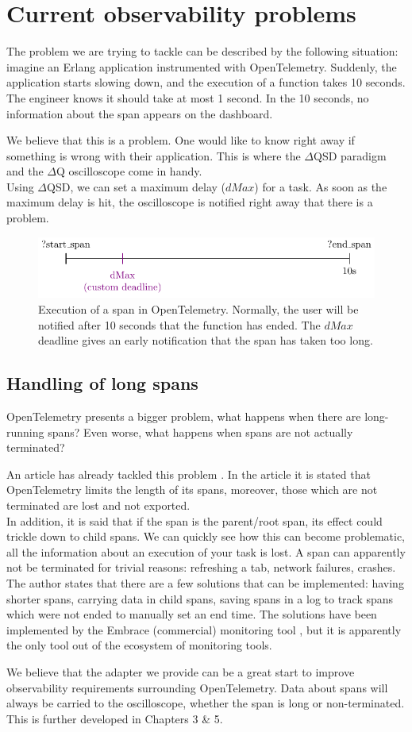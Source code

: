 \section{Current observability problems}
    The problem we are trying to tackle can be described by the following situation: 
    imagine an Erlang application instrumented with OpenTelemetry. Suddenly, the application starts slowing down, and the execution of a function takes 10 seconds. The engineer knows it should take at most 1 second. In the 10 seconds, no information about the span appears on the dashboard.
    
    We believe that this is a problem. One would like to know right away if something is wrong with their application. This is where the $\Delta$QSD paradigm and the $\Delta$Q oscilloscope come in handy. \\ 
   Using $\Delta$QSD, we can set a maximum delay ($dMax$) for a task. As soon as the maximum delay is hit, the oscilloscope is notified right away that there is a problem.
   
   \begin{figure}[H]
        \begin{center}
            \includegraphics{tikz/start_end_dmax.pdf}
        \end{center}
        \caption{Execution of a span in OpenTelemetry. Normally, the user will be notified after 10 seconds that the function has ended. The $dMax$ deadline gives an early notification that the span has taken too long.}
        \label{fig:otel_dmax}
    \end{figure} 


    \subsection{Handling of long spans}
        OpenTelemetry presents a bigger problem, what happens when there are long-running spans? Even worse, what happens when spans are not actually terminated?
        
        An article has already tackled this problem \cite{otel-l}. In the article it is stated that OpenTelemetry limits the length of its spans, moreover, those which are not terminated are lost and not exported. \\ 
        In addition, it is said that if the span is the parent/root span, its effect could trickle down to child spans. We can quickly see how this can become problematic, all the information about an execution of your task is lost. A span can apparently not be terminated for trivial reasons: refreshing a tab, network failures, crashes. The author states that there are a few solutions that can be implemented: having shorter spans, carrying data in child spans, saving spans in a log to track spans which were not ended to manually set an end time. The solutions have been implemented by the Embrace (commercial) monitoring tool \cite{embr}, but it is apparently the only tool out of the ecosystem of monitoring tools.

     We believe that the adapter we provide can be a great start to improve observability requirements surrounding OpenTelemetry. Data about spans will always be carried to the oscilloscope, whether the span is long or non-terminated. This is further developed in Chapters 3 \& 5.
